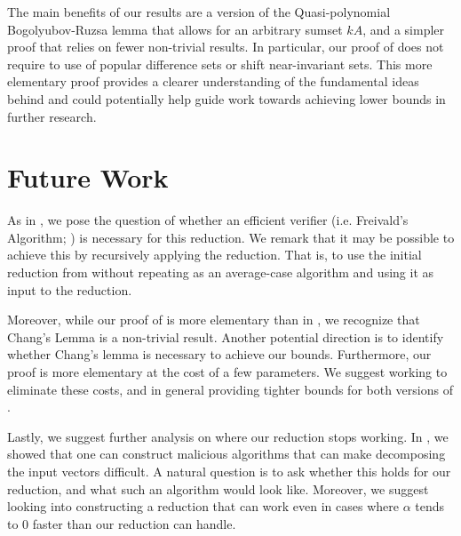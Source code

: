 \documentclass[12pt]{caltech_thesis}
\begin{document}
The main benefits of our results are a version of the Quasi-polynomial Bogolyubov-Ruzsa lemma that allows for an arbitrary sumset $kA$, and a simpler proof that relies on fewer non-trivial results. In particular, our proof of  does not require to use of popular difference sets or shift near-invariant sets. This more elementary proof provides a clearer understanding of the fundamental ideas behind  and could potentially help guide work towards achieving lower bounds in further research.

\section{Future Work}
As in \cite{asadi2022worstcase}, we pose the question of whether an efficient verifier (i.e. Freivald's Algorithm; ) is necessary for this reduction. We remark that it may be possible to achieve this by recursively applying the reduction. That is, to use the initial reduction from  without repeating as an average-case algorithm and using it as input to the reduction.

Moreover, while our proof of  is more elementary than in \cite{asadi2022worstcase}, we recognize that Chang's Lemma \cite{Chang2002} is a non-trivial result. Another potential direction is to identify whether Chang's lemma is necessary to achieve our bounds. Furthermore, our proof is more elementary at the cost of a few parameters. We suggest working to eliminate these costs, and in general providing tighter bounds for both versions of .

Lastly, we suggest further analysis on where our reduction stops working. In , we showed that one can construct malicious algorithms that can make decomposing the input vectors difficult. A natural question is to ask whether this holds for our reduction, and what such an algorithm would look like. Moreover, we suggest looking into constructing a reduction that can work even in cases where $\alpha$ tends to 0 faster than our reduction can handle.





\end{document}
